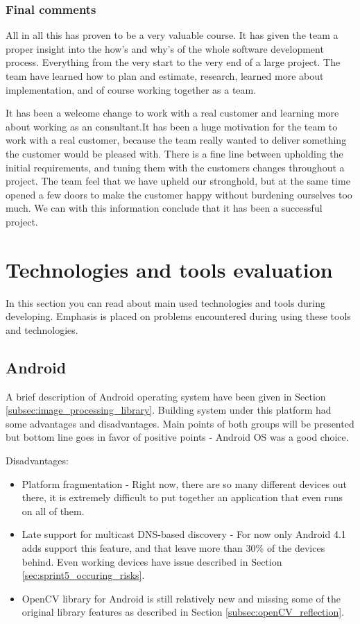 \subsubsection{Final comments}

All in all this has proven to be a very valuable course. It has given the team a proper insight into the how's and why's of the whole software development process. Everything from the very start to the very end of a large project. The team have learned how to plan and estimate, research, learned more about implementation, and of course working together as a team. 

It has been a welcome change to work with a real customer and learning more about working as an consultant.It has been a huge motivation for the team to work with a real customer, because the team really wanted to deliver something the customer would be pleased with. There is a fine line between upholding the initial requirements, and tuning them with the customers changes throughout a project. The team feel that we have upheld our stronghold, but at the same time opened a few doors to
make the customer happy without burdening ourselves too much. We can with this information
conclude that it has been a successful project.

\section{Technologies and tools evaluation}
In this section you can read about main used technologies and tools during developing.
Emphasis is placed on problems encountered during using these tools and technologies.

\subsection{Android}
A brief description of Android operating system have been given in Section \ref{subsec:image_processing_library}. Building system under this platform had some advantages and disadvantages. Main points of both groups will be presented but bottom line goes in favor of positive points - Android OS was a good choice.

Disadvantages:
\begin{itemize}
\item Platform fragmentation - Right now, there are so many different devices out there, it is extremely difficult to put together an application that even runs on all of them.
\item Late support for multicast DNS-based discovery - For now only Android 4.1 adds support this feature, and that leave more than 30\% of the devices behind. Even working devices have issue described in Section \ref{sec:sprint5_occuring_risks}.
\item OpenCV library for Android is still relatively new and missing some of the original library features as described in Section \ref{subsec:openCV_reflection}.
\end{itemize}

